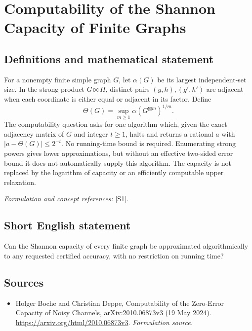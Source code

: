 \documentclass[11pt]{article}
\begin{document}
\section*{\texorpdfstring{Computability of the Shannon Capacity of Finite Graphs}{Computability of the Shannon Capacity of Finite Graphs}}\label{408}
\subsection{Definitions and mathematical statement}
For a nonempty finite simple graph $G$, let $\alpha(G)$ be its largest independent-set size. In the strong product $G\boxtimes H$, distinct pairs $(g,h),(g',h')$ are adjacent when each coordinate is either equal or adjacent in its factor. Define
\[
 \Theta(G)=\sup_{m\ge1}\alpha(G^{\boxtimes m})^{1/m}.
\]
The computability question asks for one algorithm which, given the exact adjacency matrix of $G$ and integer $t\ge1$, halts and returns a rational $a$ with $|a-\Theta(G)|\le2^{-t}$. No running-time bound is required. Enumerating strong powers gives lower approximations, but without an effective two-sided error bound it does not automatically supply this algorithm. The capacity is not replaced by the logarithm of capacity or an efficiently computable upper relaxation.
\par\smallskip\textit{Formulation and concept references:} \href{https://arxiv.org/html/2010.06873v3}{[S1]}.

\subsection{Short English statement}
Can the Shannon capacity of every finite graph be approximated algorithmically to any requested certified accuracy, with no restriction on running time?
\subsection{Sources}
\begin{itemize}
\item[S1]Holger Boche and Christian Deppe, Computability of the Zero-Error Capacity of Noisy Channels, arXiv:2010.06873v3 (19 May 2024).
\url{https://arxiv.org/html/2010.06873v3}.
\textit{Formulation source.}
\end{itemize}
\end{document}
